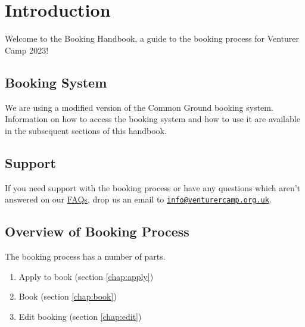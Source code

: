 \chapter{Introduction}

Welcome to the Booking Handbook, a guide to the booking process for Venturer Camp 2023!

\section{Booking System}
We are using a modified version of the Common Ground booking system. Information on how to access the booking system and how to use it are available in the subsequent sections of this handbook.

\section{Support}
If you need support with the booking process or have any questions which aren't answered on our \href{https://venturercamp.org.uk/book}{FAQs}, drop us an email to \href{mailto:info@venturercamp.org.uk}{\texttt{info@venturercamp.org.uk}}.

\section{Overview of Booking Process}
The booking process has a number of parts.
\begin{enumerate}
    \item Apply to book (section \ref*{chap:apply})
    \item Book (section \ref*{chap:book})
    \item Edit booking (section \ref*{chap:edit})
\end{enumerate}